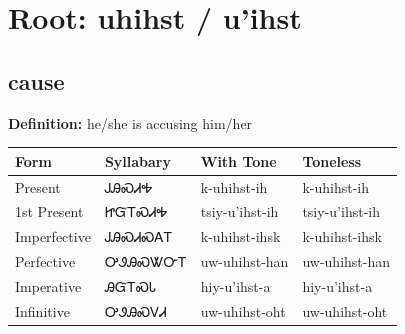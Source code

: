 \documentclass{article}%
\begin{document}
%
\normalsize%
\section*{Root: uhihst / u'ihst}%
\subsection*{cause}%
\textbf{Definition: }%
he/she is accusing him/her%
\\[0.5em]%
\begin{tabular}{|l|l|l|l|}%
\hline%
\textbf{Form}&\textbf{Syllabary}&\textbf{With Tone}&\textbf{Toneless}\\%
\hline%
Present&ᎫᎯᏍᏗᎭ&k{-}uhihst{-}ih&k{-}uhihst{-}ih\\%
1st Present&ᏥᏳᎢᏍᏗᎭ&tsiy{-}u'ihst{-}ih&tsiy{-}u'ihst{-}ih\\%
Imperfective&ᎫᎯᏍᏗᏍᎪᎢ&k{-}uhihst{-}ihsk&k{-}uhihst{-}ihsk\\%
Perfective&ᎤᏭᎯᏍᏔᏅᎢ&uw{-}uhihst{-}han&uw{-}uhihst{-}han\\%
Imperative&ᎯᏳᎢᏍᏓ&hiy{-}u'ihst{-}a&hiy{-}u'ihst{-}a\\%
Infinitive&ᎤᏭᎯᏍᏙᏗ&uw{-}uhihst{-}oht&uw{-}uhihst{-}oht\\%
\hline%
\end{tabular}%
\\[1em]%
\end{document}
